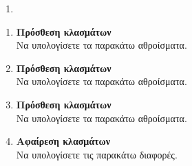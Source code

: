 \documentclass[twoside,nofonts,internet]{askhseis}
\begin{document}
\twocolkentro{\thewria}
\begin{enumerate}
\item 
\end{enumerate}
\twocolkentro{\askhseis}
\begin{enumerate}
\item \textbf{Πρόσθεση κλασμάτων}\\
Να υπολογίσετε τα παρακάτω αθροίσματα.
\begin{multicols}{2}
\end{multicols}
\item \textbf{Πρόσθεση κλασμάτων}\\
Να υπολογίσετε τα παρακάτω αθροίσματα.
\begin{multicols}{2}
\end{multicols}
\item \textbf{Πρόσθεση κλασμάτων}\\
Να υπολογίσετε τα παρακάτω αθροίσματα.
\begin{multicols}{2}
\end{multicols}
\item \textbf{Αφαίρεση κλασμάτων}\\
Να υπολογίσετε τις παρακάτω διαφορές.
\begin{multicols}{2}

\end{multicols}
\end{enumerate}
\end{document}
